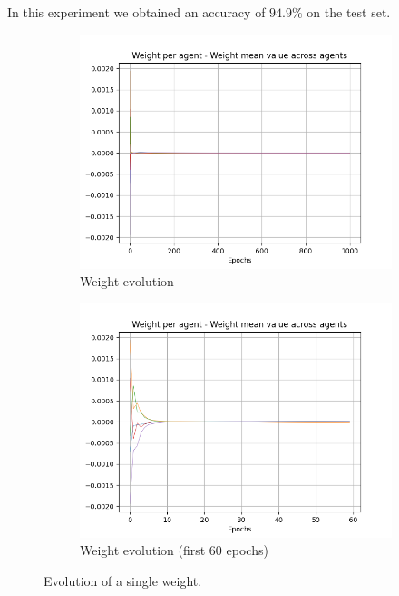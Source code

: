 \documentclass[a4paper,11pt,oneside]{book}
\begin{document}
\bigskip
In this experiment we obtained an accuracy of $94.9\%$ on the test set.

\begin{figure}[h]
\centering
	\begin{subfigure}{0.49\textwidth}	
	\includegraphics[width=\textwidth]{figs/test1/Single_weight}
	\caption{Weight evolution}
	\end{subfigure}
\hfill
	\begin{subfigure}{0.49\textwidth}	
	\includegraphics[width=\textwidth]{figs/test1/Single_weight-60}
	\caption{Weight evolution (first 60 epochs)}
	\end{subfigure}
\caption{Evolution of a single weight.}
\label{test1_var}
\end{figure}
\end{document}
